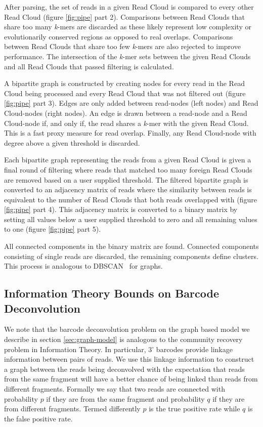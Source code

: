 After parsing, the set of reads in a given Read Cloud is compared to every other Read Cloud (figure \ref{fig:pipe} part 2). Comparisons between Read Clouds that share too many \textit{k}-mers are discarded as these likely represent low complexity or evolutionarily conserved regions as opposed to real overlaps. Comparisons between Read Clouds that share too few \textit{k}-mers are also rejected to improve performance. The intersection of the \textit{k}-mer sets between the given Read Clouds and all Read Clouds that passed filtering is calculated.

A bipartite graph is constructed by creating nodes for every read in the Read Cloud being processed and every Read Cloud that was not filtered out (figure \ref{fig:pipe} part 3). Edges are only added between read-nodes (left nodes) and Read Cloud-nodes (right nodes). An edge is drawn between a read-node and a Read Cloud-node if, and only if, the read shares a \textit{k}-mer with the given Read Cloud. This is a fast proxy measure for read overlap. Finally, any Read Cloud-node with degree above a given threshold is discarded.

Each bipartite graph representing the reads from a given Read Cloud is given a final round of filtering where reads that matched too many foreign Read Clouds are removed based on a user supplied threshold. The filtered bipartite graph is converted to an adjacency matrix of reads where the similarity between reads is equivalent to the number of Read Clouds that both reads overlapped with (figure \ref{fig:pipe} part 4). This adjacency matrix is converted to a binary matrix by setting all values below a user supplied threshold to zero and all remaining values to one (figure \ref{fig:pipe} part 5). 

All connected components in the binary matrix are found. Connected components consisting of single reads are discarded, the remaining components define clusters. This process is analogous to DBSCAN~\citep{Ester1996} for graphs.



\subsection*{Information Theory Bounds on Barcode Deconvolution}

We note that the barcode deconvolution problem on the graph based model we describe in section \ref{sec:graph-model} is analogous to the community recovery problem \citep{Girvan2002} in Information Theory. In particular, 3' barcodes provide linkage information between pairs of reads. We use this linkage information to construct a graph between the reads being deconvolved with the expectation that reads from the same fragment will have a better chance of being linked than reads from different fragments. Formally we say that two reads are connected with probability $p$ if they are from the same fragment and probability $q$ if they are from different fragments. Termed differently $p$ is the true positive rate while $q$ is the false positive rate.

